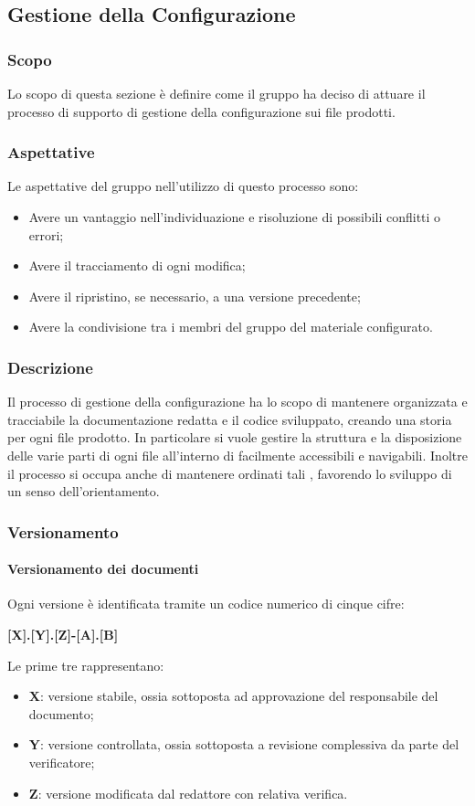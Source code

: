 \subsection{Gestione della Configurazione}
\subsubsection{Scopo}
Lo scopo di questa sezione è definire come il gruppo ha deciso di attuare il processo di supporto di gestione della configurazione sui file prodotti.

\subsubsection{Aspettative}
Le aspettative del gruppo \Gruppo{} nell'utilizzo di questo processo sono:
\begin{itemize}
	\item Avere un vantaggio nell'individuazione e risoluzione di possibili conflitti o errori;
	\item Avere il tracciamento di ogni modifica;
	\item Avere il ripristino, se necessario, a una versione precedente;
	\item Avere la condivisione tra i membri del gruppo del materiale configurato.
\end{itemize}

\subsubsection{Descrizione}
Il processo di gestione della configurazione ha lo scopo di mantenere organizzata e tracciabile la documentazione redatta e il codice sviluppato, creando una storia per ogni file prodotto. In particolare si vuole gestire la struttura e la disposizione delle varie parti di ogni file all'interno di  facilmente accessibili e navigabili.
Inoltre il processo si occupa anche di mantenere ordinati tali , favorendo lo sviluppo di un senso dell'orientamento.

\subsubsection{Versionamento}
\paragraph{Versionamento dei documenti}
Ogni versione è identificata tramite un codice numerico di cinque cifre:
\begin{center}
\textbf{[X].[Y].[Z]-[A].[B]} 
\end{center}
Le prime tre rappresentano:
\begin{itemize}
	\item \textbf{X}: versione stabile, ossia sottoposta ad approvazione del responsabile del documento;
  	\item \textbf{Y}: versione controllata, ossia sottoposta a revisione complessiva da parte del verificatore;
  	\item \textbf{Z}: versione modificata dal redattore con relativa verifica.
\end{itemize}
  
